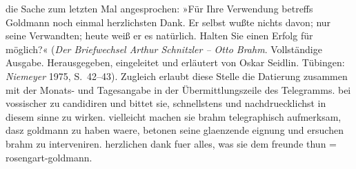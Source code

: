 {{{                  die Sache zum letzten Mal angesprochen: »Für Ihre Verwendung betreffs Goldmann noch einmal herzlichsten Dank.
                     Er selbst wußte nichts davon; nur seine Verwandten; heute weiß er es natürlich.
                     Halten Sie einen Erfolg für möglich?« (\emph{Der Briefwechsel Arthur Schnitzler – Otto Brahm}.
                        Vollständige Ausgabe. Herausgegeben, eingeleitet und erläutert von Oskar
                        Seidlin. Tübingen: \emph{Niemeyer}{ }1975, S. 42–43). Zugleich erlaubt diese Stelle die Datierung zusammen mit der Monats- und Tagesangabe in der
                  Übermittlungszeile des Telegramms.}}}\label{K_L02797-1} bei vossischer zu candidiren und bittet sie, schnellstens und nachdruecklichst
               in diesem sinne zu wirken. vielleicht machen sie brahm telegraphisch aufmerksam, dasz goldmann zu haben waere, betonen seine glaenzende eignung und ersuchen brahm zu interveniren. herzlichen dank fuer
               alles, was sie dem freunde
               thun = \spacefill\mbox{rosengart-goldmann.}\pend
           \endnumbering{}  \newcommand{\dateiname}{L02797}\newcommand{\titel}{Vally Rosengart an Arthur Schnitzler, [16. 1. 1898]}\newcommand{\editorInnen}{Martin Anton Müller und Laura Untner}
